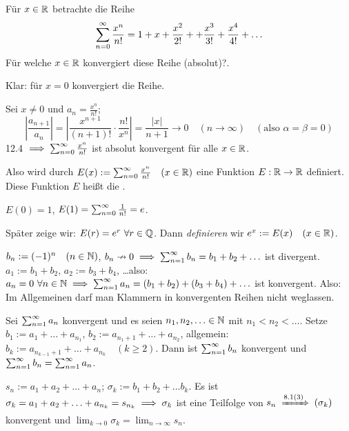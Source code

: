 \documentclass[a4paper,oneside,DIV15,BCOR12mm]{scrbook}
\begin{document}
\begin{wichtigesbeispiel}[Exponentialfunktion]
Für $x\in\mathbb{R}$ betrachte die Reihe
$$\sum_{n=0}^{\infty}{\frac{x^n}{n!}} = 1 + x + \frac{x^2}{2!} + +\frac{x^3}{3!} + \frac{x^4}{4!} + \ldots$$
Für welche $x\in\mathbb{R}$ konvergiert diese Reihe (absolut)?.

Klar: für $x=0$ konvergiert die Reihe.

Sei $x\ne0$ und $a_n=\frac{x^n}{n!}$;
$$\left|\frac{a_{n+1}}{a_n}\right| = \left| \frac{x^{n+1}}{(n+1)!} \cdot \frac{n!}{x^n}\right| = \frac{|x|}{n+1} \to 0 \quad (n\to\infty) \quad (\text{also } \alpha = \beta = 0)$$
12.4 $\implies \sum_{n=0}^{\infty}{\frac{x^n}{n!}}$ ist absolut konvergent für alle $x\in\mathbb{R}$.

Also wird durch $E(x) := \sum_{n=0}^{\infty}{\frac{x^n}{n!}} \quad (x\in\mathbb{R})$ eine Funktion $E: \mathbb{R} \to \mathbb{R}$ definiert. Diese Funktion $E$ heißt die .

$E(0) = 1$, $E(1)=\sum_{n=0}^{\infty}{\frac{1}{n!}} = e$.

\begin{bemerkung}
Später zeige wir: $E(r) = e^r \ \forall r\in\mathbb{Q}$. Dann \textit{definieren} wir $e^x := E(x) \quad (x\in\mathbb{R})$.
\end{bemerkung}
\end{wichtigesbeispiel}

\begin{motivation}
$b_n := (-1)^n \quad (n\in\mathbb{N})$, $b_n \nrightarrow 0 \implies \sum_{n=1}^{\infty}{b_n}=b_1 + b_2 + \ldots$ ist divergent. \\
$a_1 := b_1 + b_2$, $a_2 := b_3 + b_4$, \ldots also: $a_n = 0 \ \forall n\in\mathbb{N} \implies \sum_{n=1}^{\infty}{a_n} = (b_1+b_2) + (b_3+b_4) + \ldots$ ist konvergent. Also: \glqq Im Allgemeinen darf man Klammern in konvergenten Reihen nicht weglassen.\grqq
\end{motivation}

\begin{satz}

Sei $\sum_{n=1}^{\infty}{a_n}$ konvergent und es seien $n_1, n_2, \ldots \in\mathbb{N}$ mit $n_1<n_2<\ldots$. Setze $b_1 := a_1 + \ldots + a_{n_1}$, $b_2 := a_{n_1+1} + \ldots + a_{n_2}$, allgemein: $b_k := a_{n_{k-1}+1} + \ldots + a_{n_k} \quad (k\ge2)$. Dann ist $\sum_{n=1}^{\infty}{b_n}$ konvergent und $\sum_{n=1}^{\infty}{b_n} = \sum_{n=1}^{\infty}{a_n}$.
\end{satz}

\begin{beweis}
$s_n := a_1 + a_2 + \ldots + a_n$; $\sigma_k := b_1 + b_2 + \ldots b_k$. Es ist $\sigma_k = a_1 + a_2 + \ldots + a_{n_k} = s_{n_k} \implies \sigma_k$ ist eine Teilfolge von $s_n \folgtnach{8.1(3)} (\sigma_k)$ konvergent und $\lim_{k\to0}\sigma_k=\lim_{n\to\infty}s_n$.
\end{beweis}
\end{document}
